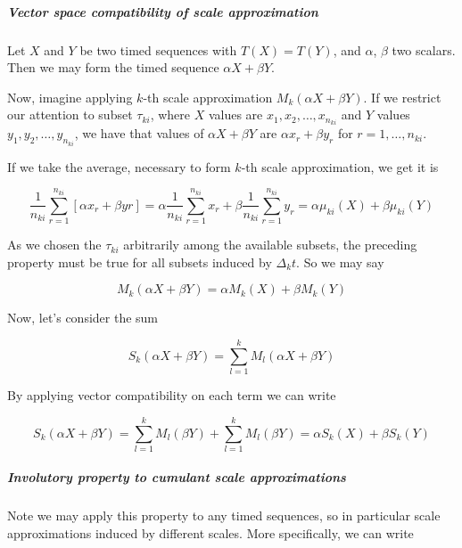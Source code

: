 \documentclass[a4paper,10pt]{book}
\begin{document}
\subparagraph{Vector space compatibility of scale approximation}

Let $X$ and $Y$ be two timed sequences with $T(X) = T(Y)$, and $\alpha$, $\beta$ two scalars. Then we may form the timed sequence $\alpha X + \beta Y$.

Now, imagine applying $k$-th scale approximation $M_{k}(\alpha X + \beta Y)$. If we restrict our attention to subset $\tau_{ki}$, where $X$ values are $x_{1}, x_{2}, \ldots, x_{n_{ki}}$ and $Y$ values $y_{1}, y_{2}, \ldots, y_{n_{ki}}$, we have that values of $\alpha X + \beta Y$ are $\alpha x_{r} + \beta y_{r}$ for $r = 1, \ldots, n_{ki}$.

If we take the average, necessary to form $k$-th scale approximation, we get it is

\begin{equation}
	\frac{1}{n_{ki}} \sum_{r=1}^{n_{ki}} \left[ \alpha x_{r} + \beta y{r} \right] =
	\alpha \frac{1}{n_{ki}} \sum_{r=1}^{n_{ki}} x_{r} + \beta \frac{1}{n_{ki}} \sum_{r=1}^{n_{ki}} y_{r} =
	\alpha \mu_{ki}(X) + \beta \mu_{ki}(Y)
\end{equation}

As we chosen the $\tau_{ki}$ arbitrarily among the available subsets, the preceding property must be true for all subsets induced by $\Delta_{k} t$. So we may say

\begin{equation}\label{eq:Compatibility of scale approximation with vector space structure of timed sequences}
	M_{k}(\alpha X + \beta Y) = \alpha M_{k}(X) + \beta M_{k}(Y)
\end{equation}

\noindent Now, let's consider the sum

\begin{equation}
	S_{k}(\alpha X + \beta Y) = \sum_{l=1}^{k} M_{l}(\alpha X + \beta Y)
\end{equation}

\noindent By applying vector compatibility on each term we can write

\begin{equation}
	S_{k}(\alpha X + \beta Y) = \sum_{l=1}^{k} M_{l}(\beta Y) + \sum_{l=1}^{k} M_{l}(\beta Y) = \alpha S_{k}(X) + \beta S_{k}(Y)
\end{equation}


\subparagraph{Involutory property to cumulant scale approximations}

Note we may apply this property to any timed sequences, so in particular scale approximations induced by different scales. More specifically, we can write
\end{document}
